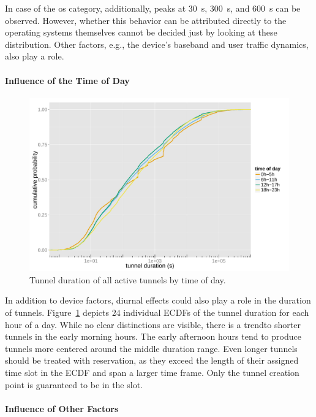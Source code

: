 In case of the \gls{os} category, additionally, peaks at \SI{30}{\second}, \SI{300}{\second}, and \SI{600}{\second} can be observed. However, whether this behavior can be attributed directly to the operating systems themselves cannot be decided just by looking at these distribution. Other factors, e.g., the device's baseband and user traffic dynamics, also play a role. 


\paragraph{Influence of the Time of Day}

\begin{figure}[htb]
	\centering
	\includegraphics[width=1.0\textwidth]{images/R-duration-timeofday-ecdf.pdf}
	\caption{Tunnel duration of all active tunnels by time of day.}
\label{c4:fig:duration-timeofday-ecdf}
\end{figure}

In addition to device factors, diurnal effects could also play a role in the duration of tunnels. Figure~\ref{c4:fig:duration-timeofday-ecdf} depicts $24$ individual \glspl{ECDF} of the tunnel duration for each hour of a day. While no clear distinctions are visible, there is a trendto shorter tunnels in the early morning hours. The early afternoon hours tend to produce tunnels more centered around the middle duration range. Even longer tunnels should be treated with reservation, as they exceed the length of their assigned time slot in the \gls{ECDF} and span a larger time frame. Only the tunnel creation point is guaranteed to be in the slot.


\paragraph{Influence of Other Factors}

